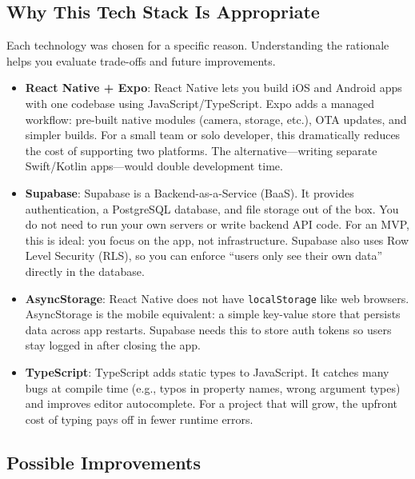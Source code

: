 \documentclass[11pt,a4paper]{article}
\begin{document}
\subsection{Why This Tech Stack Is Appropriate}

Each technology was chosen for a specific reason. Understanding the rationale helps you evaluate trade-offs and future improvements.

\begin{itemize}[leftmargin=*]
    \item \textbf{React Native + Expo}: React Native lets you build iOS and Android apps with one codebase using JavaScript/TypeScript. Expo adds a managed workflow: pre-built native modules (camera, storage, etc.), OTA updates, and simpler builds. For a small team or solo developer, this dramatically reduces the cost of supporting two platforms. The alternative---writing separate Swift/Kotlin apps---would double development time.
    
    \item \textbf{Supabase}: Supabase is a Backend-as-a-Service (BaaS). It provides authentication, a PostgreSQL database, and file storage out of the box. You do not need to run your own servers or write backend API code. For an MVP, this is ideal: you focus on the app, not infrastructure. Supabase also uses Row Level Security (RLS), so you can enforce ``users only see their own data'' directly in the database.
    
    \item \textbf{AsyncStorage}: React Native does not have \texttt{localStorage} like web browsers. AsyncStorage is the mobile equivalent: a simple key-value store that persists data across app restarts. Supabase needs this to store auth tokens so users stay logged in after closing the app.
    
    \item \textbf{TypeScript}: TypeScript adds static types to JavaScript. It catches many bugs at compile time (e.g., typos in property names, wrong argument types) and improves editor autocomplete. For a project that will grow, the upfront cost of typing pays off in fewer runtime errors.
\end{itemize}

\subsection{Possible Improvements}
\end{document}
